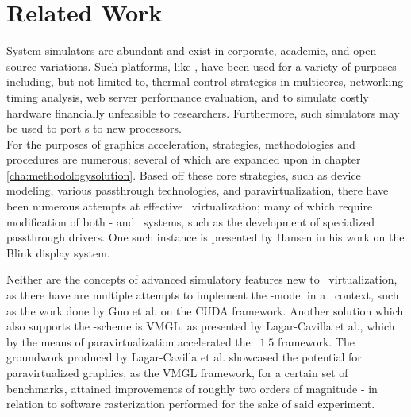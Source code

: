 
\chapter{Related Work}
\label{cha:relatedwork}
System simulators are abundant and exist in corporate, academic, and open-source variations.
Such platforms, like \dvttermsimics , have been used for a variety of purposes including, but not limited to, thermal control strategies in multicores, networking timing analysis, web server performance evaluation, and to simulate costly hardware financially unfeasible to researchers.
Furthermore, such simulators may be used to port \dvttermos s to new processors.\\

\noindent
For the purposes of graphics acceleration, strategies, methodologies and procedures are numerous; several of which are expanded upon in chapter \ref{cha:methodologysolution}.
Based off these core strategies, such as device modeling, various passthrough technologies, and paravirtualization, there have been numerous attempts at effective \dvttermgpu\ virtualization; many of which require modification of both \dvttermtarget - and \dvttermhost\ systems, such as the development of specialized passthrough drivers.
One such instance is presented by Hansen in his work on the Blink display system.

Neither are the concepts of advanced simulatory features new to \dvttermgpu\ virtualization, as there have are multiple attempts to implement the \dvttermcheckpointrestart -model in a \dvttermgpu\ context, such as the work done by Guo et al. on the CUDA framework.
Another solution which also supports the \dvttermcheckpointrestart -scheme is VMGL, as presented by Lagar-Cavilla et al., which by the means of paravirtualization accelerated the \dvttermopengl\ $1.5$ framework.
The groundwork produced by Lagar-Cavilla et al. showcased the potential for paravirtualized graphics, as the VMGL framework, for a certain set of benchmarks, attained improvements of roughly two orders of magnitude - in relation to software rasterization performed for the sake of said experiment.

